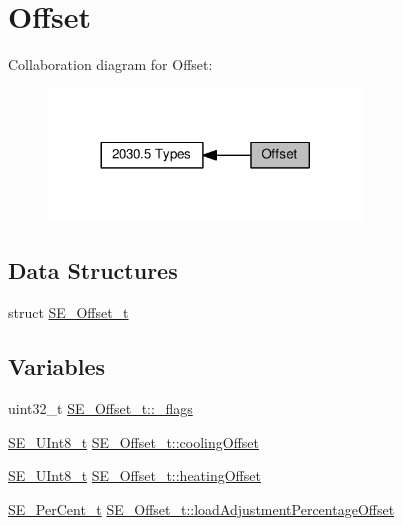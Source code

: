 \hypertarget{group__Offset}{}\section{Offset}
\label{group__Offset}
Collaboration diagram for Offset\+:\nopagebreak
\begin{figure}[H]
\begin{center}
\leavevmode
\includegraphics[width=236pt]{group__Offset}
\end{center}
\end{figure}
\subsection*{Data Structures}
\begin{DoxyCompactItemize}
\item 
struct \hyperlink{structSE__Offset__t}{S\+E\+\_\+\+Offset\+\_\+t}
\end{DoxyCompactItemize}
\subsection*{Variables}
\begin{DoxyCompactItemize}
\item 
uint32\+\_\+t \hyperlink{group__Offset_gace5a81a43bae113bcd0c8770fbd38ed2}{S\+E\+\_\+\+Offset\+\_\+t\+::\+\_\+flags}
\item 
\hyperlink{group__UInt8_gaf7c365a1acfe204e3a67c16ed44572f5}{S\+E\+\_\+\+U\+Int8\+\_\+t} \hyperlink{group__Offset_ga86382d921f0bb39066867b7519d207fa}{S\+E\+\_\+\+Offset\+\_\+t\+::cooling\+Offset}
\item 
\hyperlink{group__UInt8_gaf7c365a1acfe204e3a67c16ed44572f5}{S\+E\+\_\+\+U\+Int8\+\_\+t} \hyperlink{group__Offset_ga40bf7a0665bcb020988d5aaa8e0f23a7}{S\+E\+\_\+\+Offset\+\_\+t\+::heating\+Offset}
\item 
\hyperlink{group__PerCent_ga14278cbee754c63496035b722b417ddc}{S\+E\+\_\+\+Per\+Cent\+\_\+t} \hyperlink{group__Offset_ga1f508f716b28a7d822a64597dd800c32}{S\+E\+\_\+\+Offset\+\_\+t\+::load\+Adjustment\+Percentage\+Offset}
\end{DoxyCompactItemize}


